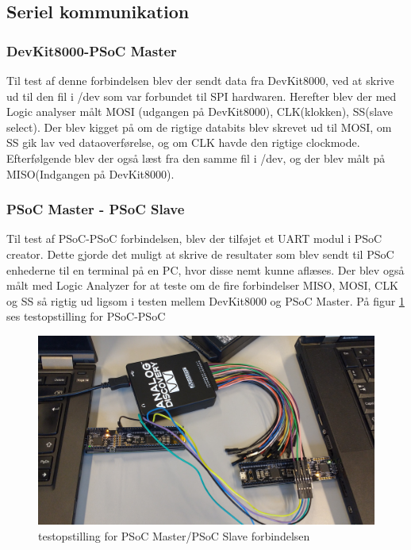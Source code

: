 \subsection{Seriel kommunikation}

\subsubsection{DevKit8000-PSoC Master}
Til test af denne forbindelsen blev der sendt data fra DevKit8000, ved at skrive ud til den fil i /dev som var forbundet til SPI hardwaren. Herefter blev der
med Logic analyser målt MOSI (udgangen på DevKit8000), CLK(klokken), SS(slave select). Der blev kigget på om de rigtige databits blev skrevet ud
til MOSI, om SS gik lav ved dataoverførelse, og om CLK havde den rigtige clockmode. Efterfølgende blev der også læst fra den samme fil i /dev, og der blev målt
på MISO(Indgangen på DevKit8000).

\subsubsection{PSoC Master - PSoC Slave}
Til test af PSoC-PSoC forbindelsen, blev der tilføjet et UART modul i PSoC creator. Dette gjorde det muligt at skrive de resultater som blev sendt til PSoC 
enhederne til en terminal på en PC, hvor disse nemt kunne aflæses. Der blev også målt med Logic Analyzer for at teste om de fire forbindelser MISO, MOSI, CLK 
og SS så rigtig ud ligsom i testen mellem DevKit8000 og PSoC Master. På figur \ref{testopstillen_PSoC_PSoC} ses testopstilling for PSoC-PSoC\\

\begin{figure}[H]
	\centerline{\includegraphics[scale=0.07]{tex/TeImRe/SPI/SPI_testAnalog}}
	\caption{testopstilling for PSoC Master/PSoC Slave forbindelsen}
	\label{testopstillen_PSoC_PSoC}
\end{figure}